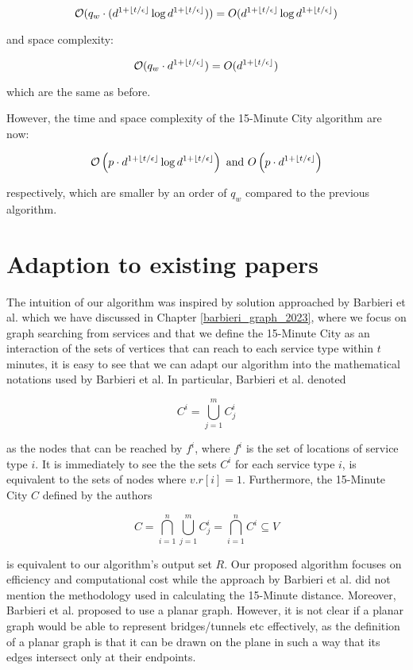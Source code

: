 $$\mathcal{O}(q_w\cdot(d^{1+\floor*{t/\epsilon}}\log d^{1+\floor*{t/\epsilon}}))=O(d^{1+\floor*{t/\epsilon}}\log d^{1+\floor*{t/\epsilon}})$$

and space complexity:

$$\mathcal{O}(q_w\cdot d^{1+\floor*{t/\epsilon}})=O(d^{1+\floor*{t/\epsilon}})$$

which are the same as before.

However, the time and space complexity of the 15-Minute City algorithm are now:

$$\mathcal{O}\left(p\cdot d^{1+\floor*{t/\epsilon}}\log d^{1+\floor*{t/\epsilon}}\right)\text{ and }O\left(p\cdot d^{1+\floor*{t/\epsilon}}\right)$$

respectively, which are smaller by an order of $q_w$ compared to the previous algorithm.

\section{Adaption to existing papers}

The intuition of our algorithm was inspired by solution approached by Barbieri et al. \cite{barbieri_graph_2023} which we have discussed in Chapter \ref{barbieri_graph_2023}, where we focus on graph searching from services and that we define the 15-Minute City as an interaction of the sets of vertices that can reach to each service type within $t$ minutes, it is easy to see that we can adapt our algorithm into the mathematical notations used by Barbieri et al. In particular, Barbieri et al. denoted

$$C^i=\bigcup\limits_{j=1}^m C^i_j$$

as the nodes that can be reached by $f^i$, where $f^i$ is the set of locations of service type $i$. It is immediately to see the the sets $C^i$ for each service type $i$, is equivalent to the sets of nodes where $v.r[i]=1$. Furthermore, the 15-Minute City $C$ defined by the authors

$$C=\bigcap\limits_{i=1}^n\bigcup\limits_{j=1}^m C^i_j=\bigcap\limits_{i=1}^n C^i\subseteq V$$

is equivalent to our algorithm's output set $R$. Our proposed algorithm focuses on efficiency and computational cost while the approach by Barbieri et al. did not mention the methodology used in calculating the 15-Minute distance. Moreover, Barbieri et al. proposed to use a planar graph. However, it is not clear if a planar graph would be able to represent bridges/tunnels etc effectively, as the definition of a planar graph is that it can be drawn on the plane in such a way that its edges intersect only at their endpoints.


